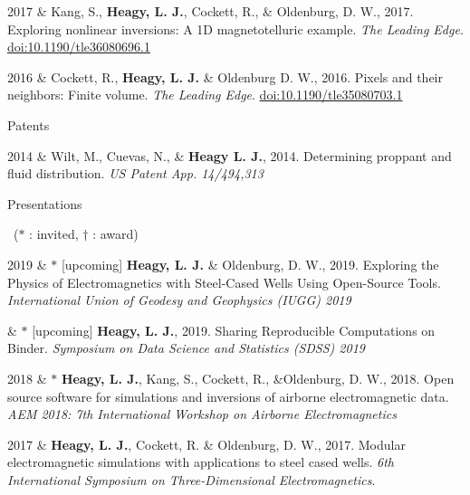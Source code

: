 \documentclass[a4paper, 11pt]{article}
\newcommand{\doi}[1]{\href{https://doi.org/#1}{doi:#1}}
\newcommand{\subheading}[1]{
    \vspace{0.4cm}
    {\Large #1}\\
    \vspace{-0.2cm}
}
\begin{document}
\begin{entryright}
2017 & Kang, S., \textbf{Heagy, L. J.}, Cockett, R.,  \& Oldenburg, D. W., 2017. Exploring nonlinear inversions: A 1D magnetotelluric example. \emph{The Leading Edge}. \doi{10.1190/tle36080696.1}
\end{entryright}

\begin{entryright}
2016 & Cockett, R., \textbf{Heagy, L. J.} \& Oldenburg D. W., 2016. Pixels and their neighbors: Finite volume. \emph{The Leading Edge}. \doi{10.1190/tle35080703.1}
\end{entryright}

\subheading{Patents}

\begin{entryright}
2014 & Wilt, M., Cuevas, N., \& \textbf{Heagy L. J.}, 2014. Determining proppant and fluid distribution. \emph{US Patent App. 14/494,313}
\end{entryright}



\subheading{Presentations}

\vspace{-0.3cm}
~($*$ : invited,  $\dagger$ : award)
\vspace{0.2cm}

\begin{entryright}
2019 & $*$ [upcoming] \textbf{Heagy, L. J.} \& Oldenburg, D. W., 2019. Exploring the Physics of Electromagnetics with Steel-Cased Wells Using Open-Source Tools. \emph{International Union of Geodesy and Geophysics (IUGG) 2019}
\end{entryright}

\begin{entryright}
& $*$ [upcoming] \textbf{Heagy, L. J.}, 2019. Sharing Reproducible Computations on Binder. \emph{Symposium on Data Science and Statistics (SDSS) 2019}
\end{entryright}

\begin{entryright}
2018 & $*$ \textbf{Heagy, L. J.}, Kang, S., Cockett, R., \&Oldenburg, D. W., 2018. Open source software for simulations and inversions of airborne electromagnetic data. \emph{AEM 2018: 7th International Workshop on Airborne Electromagnetics}
\end{entryright}

\begin{entryright}
2017 & \textbf{Heagy, L. J.}, Cockett, R. \& Oldenburg, D. W., 2017. Modular electromagnetic simulations with applications to steel cased wells. \emph{6th International Symposium on Three-Dimensional Electromagnetics}.
\end{entryright}
\end{document}
